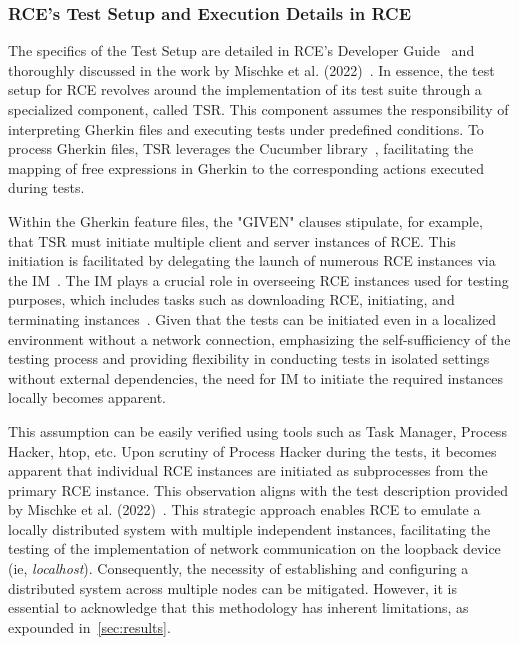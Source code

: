 \subsubsection{\ac{RCE}'s Test Setup and Execution Details in RCE}
The specifics of the Test Setup are detailed in \ac{RCE}'s Developer Guide~\cite{rceDevGuide10x} and thoroughly discussed in the work by Mischke et al. (2022)~\cite{10.1007/978-3-031-08760-8_44}. In essence, the test setup for \ac{RCE} revolves around the implementation of its test suite through a specialized component, called \acf{TSR}. This component assumes the responsibility of interpreting Gherkin files and executing tests under predefined conditions. To process Gherkin files, \ac{TSR} leverages the Cucumber library~\cite{10.1007/978-3-031-08760-8_44}, facilitating the mapping of free expressions in Gherkin to the corresponding actions executed during tests.

Within the Gherkin feature files, the "GIVEN" clauses stipulate, for example, that \ac{TSR} must initiate multiple client and server instances of \ac{RCE}. This initiation is facilitated by delegating the launch of numerous \ac{RCE} instances via the \acf{IM}~\cite{rceDevGuide10x}. 
The \ac{IM} plays a crucial role in overseeing \ac{RCE} instances used for testing purposes, which includes tasks such as downloading \ac{RCE}, initiating, and terminating instances~\cite{10.1007/978-3-031-08760-8_44,rceDevGuide10x}. Given that the tests can be initiated even in a localized environment without a network connection, emphasizing the self-sufficiency of the testing process and providing flexibility in conducting tests in isolated settings without external dependencies, the need for \ac{IM} to initiate the required instances locally becomes apparent.

This assumption can be easily verified using tools such as Task Manager, Process Hacker, htop, etc. Upon scrutiny of Process Hacker during the tests, it becomes apparent that individual \ac{RCE} instances are initiated as subprocesses from the primary \ac{RCE} instance. This observation aligns with the test description provided by Mischke et al. (2022)~\cite{10.1007/978-3-031-08760-8_44}. This strategic approach enables \ac{RCE} to emulate a locally distributed system with multiple independent instances, facilitating the testing of the implementation of network communication on the loopback device (ie, \textit{ localhost}). Consequently, the necessity of establishing and configuring a distributed system across multiple nodes can be mitigated. However, it is essential to acknowledge that this methodology has inherent limitations, as expounded in~\cref{sec:results}.


